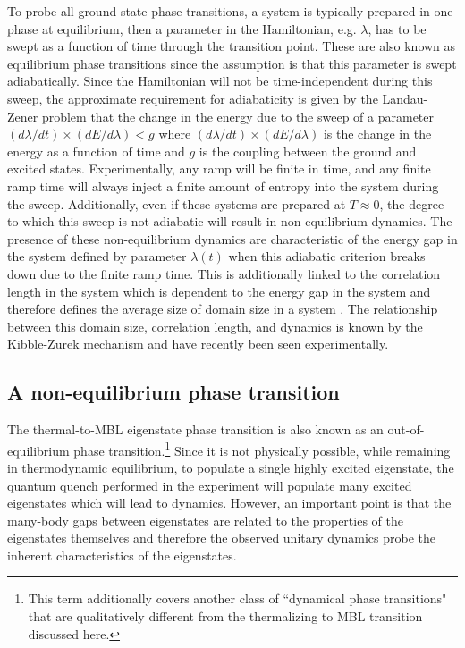 To probe all ground-state phase transitions, a system is typically prepared in one phase at equilibrium, then a parameter in the Hamiltonian, e.g. $\lambda$, has to be swept as a function of time through the transition point. These are also known as equilibrium phase transitions since the assumption is that this parameter is swept adiabatically. Since the Hamiltonian will not be time-independent during this sweep, the approximate requirement for adiabaticity is given by the Landau-Zener problem that the change in the energy due to the sweep of a parameter $(d\lambda /dt)\times(dE/d \lambda) < g$ where  $(d\lambda /dt)\times(dE/d \lambda)$ is the change in the energy as a function of time and $g$ is the coupling between the ground and excited states. Experimentally, any ramp will be finite in time, and any finite ramp time will always inject a finite amount of entropy into the system during the sweep. Additionally, even if these systems are prepared at $T\approx 0$, the degree to which this sweep is not adiabatic will result in non-equilibrium dynamics. The presence of these non-equilibrium dynamics are characteristic of the energy gap in the system defined by parameter $\lambda(t)$ when this adiabatic criterion breaks down due to the finite ramp time. This is additionally linked to the correlation length in the system which is dependent to the energy gap in the system and therefore defines the average size of domain size in a system \cite{Sachdev2011}. The relationship between this domain size, correlation length, and dynamics is known by the Kibble-Zurek mechanism \cite{Polkovnikov2005,Zurek2005} and have recently been seen experimentally\cite{Keesling2019}. 


\subsection{A non-equilibrium phase transition}

The thermal-to-MBL eigenstate phase transition is also known as an out-of-equilibrium phase transition.\footnote{This term additionally covers another class of ``dynamical phase transitions" that are qualitatively different from the thermalizing to MBL transition discussed here.}  Since it is not physically possible, while remaining in thermodynamic equilibrium, to populate a single highly excited eigenstate, the quantum quench performed in the experiment will populate many excited eigenstates which will lead to dynamics. However, an important point is that the many-body gaps between eigenstates are related to the properties of the eigenstates themselves and therefore the observed unitary dynamics probe the inherent characteristics of the eigenstates\cite{Huse2013,Nandkishore2015,Alet2018,Abanin2018}.


